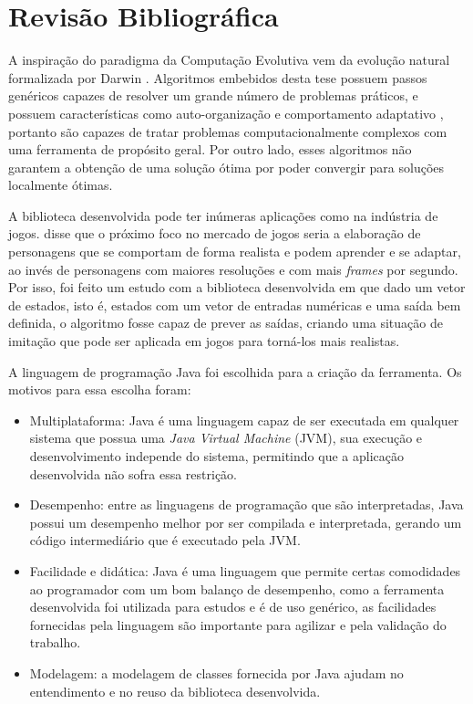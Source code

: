 \section{Revisão Bibliográfica} \label{secao:rev_bib}

A inspiração do paradigma da Computação Evolutiva vem da evolução natural formalizada por Darwin \cite{Ridley1996}. Algoritmos embebidos desta tese possuem passos genéricos capazes de resolver um grande número de problemas práticos, e possuem características como auto-organização e comportamento adaptativo \cite{Goldberg1988}, portanto são capazes de tratar problemas computacionalmente complexos com uma ferramenta de propósito geral. Por outro lado, esses algoritmos não garantem a obtenção de uma solução ótima \cite{Zuben2000} por poder convergir para soluções localmente ótimas.

A biblioteca desenvolvida pode ter inúmeras aplicações como na indústria de jogos.  disse que o próximo foco no mercado de jogos seria a elaboração de personagens que se comportam de forma realista e podem aprender e se adaptar, ao invés de personagens com maiores resoluções e com mais \textit{frames} por segundo. Por isso, foi feito um estudo com a biblioteca desenvolvida em que dado um vetor de estados, isto é, estados com um vetor de entradas numéricas e uma saída bem definida, o algoritmo fosse capaz de prever as saídas, criando uma situação de imitação que pode ser aplicada em jogos para torná-los mais realistas.

A linguagem de programação Java foi escolhida para a criação da ferramenta. Os motivos para essa escolha foram:

\newcommand{\JVM}{JVM\xspace}

\begin{itemize}
    \item Multiplataforma: Java é uma linguagem capaz de ser executada em qualquer sistema que possua uma \textit{Java Virtual Machine} (JVM), sua execução e desenvolvimento independe do sistema, permitindo que a aplicação desenvolvida não sofra essa restrição.
    \item Desempenho: entre as linguagens de programação que são interpretadas, Java possui um desempenho melhor por ser compilada e interpretada, gerando um código intermediário que é executado pela \JVM.
    \item Facilidade e didática: Java é uma linguagem que permite certas comodidades ao programador com um bom balanço de desempenho, como a ferramenta desenvolvida foi utilizada para estudos e é de uso genérico, as facilidades fornecidas pela linguagem são importante para agilizar e pela validação do trabalho.
    \item Modelagem: a modelagem de classes fornecida por Java ajudam no entendimento e no reuso da biblioteca desenvolvida.
\end{itemize}

